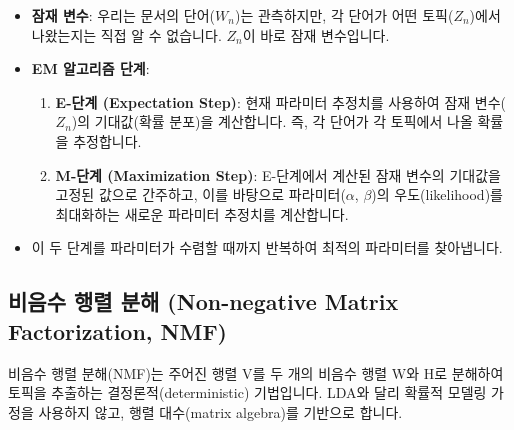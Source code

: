 \documentclass[11pt,a4paper]{article}
\theoremstyle{definition}
\begin{document}
\begin{itemize}
    \item \textbf{잠재 변수}: 우리는 문서의 단어($W_n$)는 관측하지만, 각 단어가 어떤 토픽($Z_n$)에서 나왔는지는 직접 알 수 없습니다. $Z_n$이 바로 잠재 변수입니다.
    \item \textbf{EM 알고리즘 단계}:
    \begin{enumerate}
        \item \textbf{E-단계 (Expectation Step)}: 현재 파라미터 추정치를 사용하여 잠재 변수($Z_n$)의 기대값(확률 분포)을 계산합니다. 즉, 각 단어가 각 토픽에서 나올 확률을 추정합니다.
        \item \textbf{M-단계 (Maximization Step)}: E-단계에서 계산된 잠재 변수의 기대값을 고정된 값으로 간주하고, 이를 바탕으로 파라미터($\alpha$, $\beta$)의 우도(likelihood)를 최대화하는 새로운 파라미터 추정치를 계산합니다.
    \end{enumerate}
    \item 이 두 단계를 파라미터가 수렴할 때까지 반복하여 최적의 파라미터를 찾아냅니다.
\end{itemize}

\newpage
\subsection*{비음수 행렬 분해 (Non-negative Matrix Factorization, NMF)}
\begin{infobox} %
비음수 행렬 분해(NMF)는 주어진 행렬 V를 두 개의 비음수 행렬 W와 H로 분해하여 토픽을 추출하는 결정론적(deterministic) 기법입니다.
LDA와 달리 확률적 모델링 가정을 사용하지 않고, 행렬 대수(matrix algebra)를 기반으로 합니다.
\end{infobox}
\end{document}
